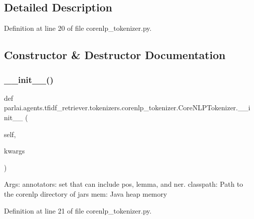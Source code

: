 \subsection{Detailed Description}


Definition at line 20 of file corenlp\+\_\+tokenizer.\+py.



\subsection{Constructor \& Destructor Documentation}
\mbox{\label{classparlai_1_1agents_1_1tfidf__retriever_1_1tokenizers_1_1corenlp__tokenizer_1_1CoreNLPTokenizer_a69a5d8b41630a6bb53b3680a68136e8f}} 
\subsubsection{\texorpdfstring{\+\_\+\+\_\+init\+\_\+\+\_\+()}{\_\_init\_\_()}}
{\footnotesize\ttfamily def parlai.\+agents.\+tfidf\+\_\+retriever.\+tokenizers.\+corenlp\+\_\+tokenizer.\+Core\+N\+L\+P\+Tokenizer.\+\_\+\+\_\+init\+\_\+\+\_\+ (\begin{DoxyParamCaption}\item[{}]{self,  }\item[{}]{kwargs }\end{DoxyParamCaption})}

\begin{DoxyVerb}Args:
    annotators: set that can include pos, lemma, and ner.
    classpath: Path to the corenlp directory of jars
    mem: Java heap memory
\end{DoxyVerb}
 

Definition at line 21 of file corenlp\+\_\+tokenizer.\+py.


